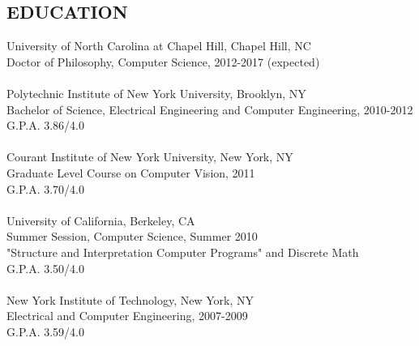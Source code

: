 \documentclass{res}
\begin{document}
 

\address{\bf E-MAIL \\ \texttt{cshao@cs.unc.edu}\\            \\ }    
\address{\bf  PRESENT ADDRESS\\425 Hillsborough ST, APT 6C\\Chapel Hill, NC 27514\\(919) 619-0326}

                                  
\begin{resume}

 
\section{EDUCATION}   
    University of North Carolina at Chapel Hill, Chapel Hill, NC\\        
    Doctor of Philosophy, Computer Science, 2012-2017 (expected) \\        
    \\           
    Polytechnic Institute of New York University,  Brooklyn, NY\\        
    Bachelor of Science, Electrical Engineering and Computer Engineering, 2010-2012 \\        
    G.P.A. 3.86/4.0 \\
    \\    
    Courant Institute of New York University, New York, NY\\
    Graduate Level Course on Computer Vision, 2011\\
    G.P.A. 3.70/4.0\\
    \\
    University of California, Berkeley, CA\\ 
    Summer Session, Computer Science, Summer 2010\\
"Structure and Interpretation Computer Programs" and Discrete Math\\
    G.P.A. 3.50/4.0\\
    \\
    New York Institute of Technology, New York, NY\\
    Electrical and Computer Engineering, 2007-2009\\
    G.P.A. 3.59/4.0\\
 

\end{resume}
\end{document}
